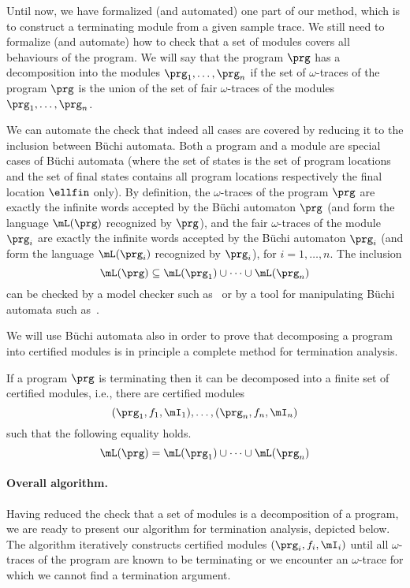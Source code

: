 Until now, we have formalized (and automated) one part of our method, which is to construct a terminating module from a given sample trace.
We still need to formalize (and automate) how to check that a set of modules covers all behaviours of the program.
We will say that   the program $\prg$ has a decomposition into the modules $\prg_1,\ldots,\prg_n$ if the set of $\omega$-traces of the program $\prg$ is the union of the set of fair  $\omega$-traces of the modules $\prg_1,\ldots,\prg_n$.

We can automate the check that indeed all cases are covered by reducing it to the inclusion between Büchi automata.  Both a program and a module are special cases of Büchi automata (where the set of states is the set of program locations and the set of final states contains all program locations respectively the final location $\ellfin$ only).  By definition, the $\omega$-traces of the program $\prg$ are exactly the infinite words accepted by the Büchi automaton $\prg$ (and form the language $\mL(\prg)$ recognized by $\prg$), and
 the fair $\omega$-traces of the module $\prg_i$ are exactly the infinite words accepted by the Büchi automaton  $\prg_i$  (and  form the language $\mL(\prg_i)$  recognized by  $\prg_i$), for $i=1,\ldots,n$.   The inclusion
 $$\mL(\prg) \subseteq \mL(\prg_1)\cup\dots\cup \mL(\prg_n)$$
can be checked by a model checker such as~\cite{journals/tse/Holzmann97} or by a tool for manipulating Büchi automata such as~\cite{cav/TsaiTH13}.

We will use Büchi automata also in order to prove that decomposing a program into certified modules is in principle a complete method for termination analysis.

\begin{theorem}[completeness]\label{thm:completeness}
If a program $\prg$ is terminating then it can be decomposed into a finite set of certified modules, i.e.,
there are certified modules $$(\prg_1,f_1,\mI_1),\dots,(\prg_n,f_n,\mI_n)$$ such that the following equality holds.
$$\mL(\prg) = \mL(\prg_1)\cup\dots\cup \mL(\prg_n)$$
\end{theorem}



\paragraph{Overall algorithm.}
Having reduced the check that a set of modules is a decomposition of a program, we are ready to present our algorithm for termination analysis, depicted below.
The algorithm iteratively constructs certified modules $(\prg_i,f_i,\mI_i)$ until all $\omega$-traces of the program are known to be terminating or we encounter an $\omega$-trace for which we cannot find a termination argument.

